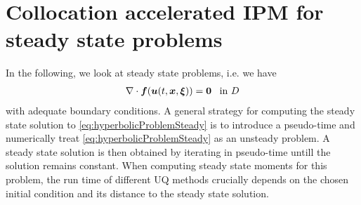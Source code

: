 \section{Collocation accelerated IPM for steady state problems}
\label{sec:collIPM}

In the following, we look at steady state problems, i.e. we have
\begin{align}\label{eq:hyperbolicProblemSteady}
\nabla\cdot\bm{f}(\bm{u}(t,\bm{x},\bm{\xi})) = \bm{0} \enskip \text{ in } D
\end{align}
with adequate boundary conditions. A general strategy for computing the steady state solution to \eqref{eq:hyperbolicProblemSteady} is to introduce a pseudo-time and numerically treat \eqref{eq:hyperbolicProblemSteady} as an unsteady problem. A steady state solution is then obtained by iterating in pseudo-time untill the solution remains constant.
When computing steady state moments for this problem, the run time of different UQ methods crucially depends on the chosen initial condition and its distance to the steady state solution.